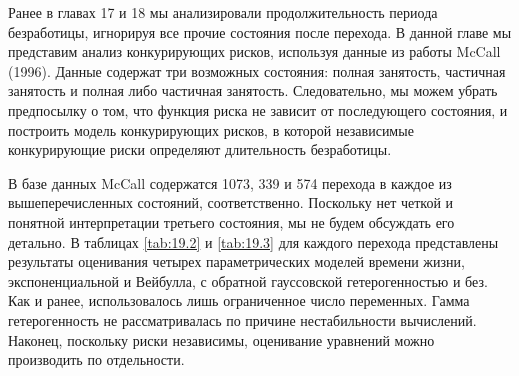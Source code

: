 \noindent
Ранее в главах 17 %
и 18 %
мы анализировали продолжительность периода безработицы, игнорируя все прочие состояния после перехода. В данной главе мы представим анализ конкурирующих рисков, используя данные из работы McCall (1996). Данные содержат три возможных состояния: полная занятость, частичная занятость и полная либо частичная занятость. Следовательно, мы можем убрать предпосылку о том, что функция риска не зависит от последующего состояния, и построить модель конкурирующих рисков, в которой независимые конкурирующие риски определяют длительность безработицы.

В базе данных McCall содержатся 1073, 339 и 574 перехода в каждое из вышеперечисленных состояний, соответственно. Поскольку нет четкой и понятной интерпретации третьего состояния, мы не будем обсуждать его детально. В таблицах \ref{tab:19.2} и \ref{tab:19.3} для каждого перехода представлены результаты оценивания четырех параметрических моделей времени жизни, экспоненциальной и Вейбулла, с обратной гауссовской гетерогенностью и без. Как и ранее, использовалось лишь ограниченное число переменных. Гамма гетерогенность не рассматривалась по причине нестабильности вычислений. Наконец, поскольку риски независимы, оценивание уравнений можно производить по отдельности.

